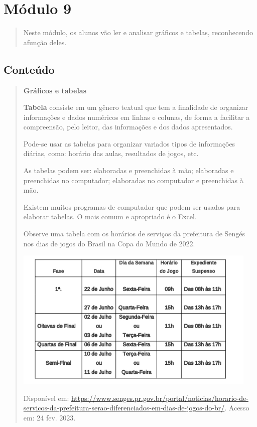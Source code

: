 \section{Módulo 9}\label{muxf3dulo-9}

\begin{quote}
Neste módulo, os alunos vão ler e analisar gráficos e tabelas,
reconhecendo afunção deles.
\end{quote}

\subsection{Conteúdo}\label{conteuxfado-8}

\begin{quote}
\textbf{Gráficos e tabelas}

\textbf{Tabela} consiste em um gênero textual que tem a finalidade de
organizar informações e dados numéricos em linhas e colunas, de forma a
facilitar a compreensão, pelo leitor, das informações e dos dados
apresentados.

Pode-se usar as tabelas para organizar variados tipos de informações
diárias, como: horário das aulas, resultados de jogos, etc.

As tabelas podem ser: elaboradas e preenchidas à mão; elaboradas e
preenchidas no computador; elaboradas no computador e preenchidas à mão.

Existem muitos programas de computador que podem ser usados para
elaborar tabelas. O mais comum e apropriado é o Excel.

Observe uma tabela com os horários de serviços da prefeitura de Sengés
nos dias de jogos do Brasil na Copa do Mundo de 2022.

\includegraphics[width=4.56744in,height=2.66667in]{media/image28.png}

Disponível em:
\url{https://www.senges.pr.gov.br/portal/noticias/horario-de-servicos-da-prefeitura-serao-diferenciados-em-dias-de-jogos-do-br/}.
Acesso em: 24 fev. 2023.


\end{quote}
